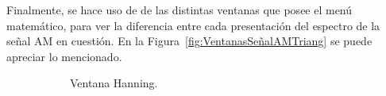       Finalmente, se hace uso de de las distintas ventanas que posee el menú matemático, para ver la diferencia
      entre cada presentación del espectro de la señal AM en cuestión. En la Figura~\ref{fig:VentanasSeñalAMTriang}
      se puede apreciar lo mencionado.

      \begin{figure}[H]
        \centering
        \begin{subfigure}[H]{0.48\textwidth}
          \caption{Ventana Hanning.}
        \end{subfigure}
        \hfill 
        \begin{subfigure}[H]{0.48\textwidth}

\end{subfigure}
\end{figure}
